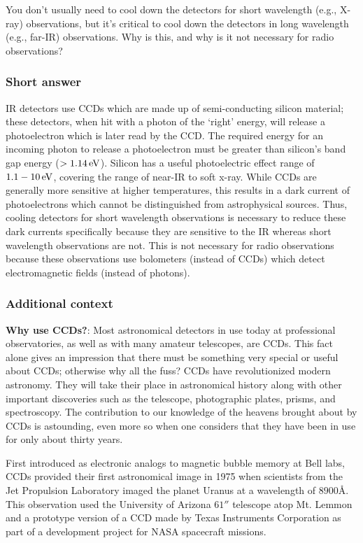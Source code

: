 \documentclass[a4paper,10pt]{article}
\begin{document}
You don't usually need to cool down the detectors for short wavelength (e.g., X-ray) observations, but it's critical to cool down the detectors in long wavelength (e.g., far-IR) observations. Why is this, and why is it not necessary for radio observations?

\subsubsection{Short answer}

IR detectors use CCDs which are made up of semi-conducting silicon material; these detectors, when hit with a photon of the `right' energy, will release a photoelectron which is later read by the CCD. The required energy for an incoming photon to release a photoelectron must be greater than silicon's band gap energy ($>1.14\,{\rm eV}$). Silicon has a useful photoelectric effect range of $1.1-10\,{\rm eV}$, covering the range of near-IR to soft x-ray. While CCDs are generally more sensitive at higher temperatures, this results in a dark current of photoelectrons which cannot be distinguished from astrophysical sources. Thus, cooling detectors for short wavelength observations is necessary to reduce these dark currents specifically because they are sensitive to the IR whereas short wavelength observations are not. This is not necessary for radio observations because these observations use bolometers (instead of CCDs) which detect electromagnetic fields (instead of photons).

\subsubsection{Additional context}

{\noindent}\textbf{Why use CCDs?}: Most astronomical detectors in use today at professional observatories, as well as with many amateur telescopes, are CCDs. This fact alone gives an impression that there must be something very special or useful about CCDs; otherwise why all the fuss? CCDs have revolutionized modern astronomy. They will take their place in astronomical history along with other important discoveries such as the telescope, photographic plates, prisms, and spectroscopy. The contribution to our knowledge of the heavens brought about by CCDs is astounding, even more so when one considers that they have been in use for only about thirty years.

{\noindent}First introduced as electronic analogs to magnetic bubble memory at Bell labs, CCDs provided their first astronomical image in 1975 when scientists from the Jet Propulsion Laboratory imaged the planet Uranus at a wavelength of $8900$\AA. This observation used the University of Arizona $61''$ telescope atop Mt. Lemmon and a prototype version of a CCD made by Texas Instruments Corporation as part of a development project for NASA spacecraft missions.
\end{document}
